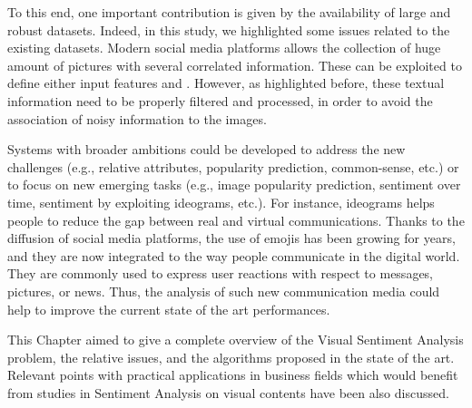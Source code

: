 
To this end, one important contribution is given by the availability of large and robust datasets. Indeed, in this study, we highlighted some issues related to the existing datasets.
Modern social media platforms allows the collection of huge amount of pictures with several correlated information. These can be exploited to define either input features and . However, as highlighted before, these textual information need to be properly filtered and processed, in order to avoid the association of noisy information to the images.

Systems with broader ambitions could be developed to address the new challenges (e.g., relative attributes, popularity prediction, common-sense, etc.) or to focus on new emerging tasks (e.g., image popularity prediction, sentiment over time, sentiment by exploiting ideograms, etc.).
For instance, ideograms helps people to reduce the gap between real and virtual communications. Thanks to the diffusion of social media platforms, the use of emojis has been growing for years, and they are now integrated to the way people communicate in the digital world. They are commonly used to express user reactions with respect to messages, pictures, or news. Thus, the analysis of such new communication media could help to improve the current state of the art performances.  

This Chapter aimed to give a complete overview of the Visual Sentiment Analysis problem, the relative issues, and the algorithms proposed in the state of the art. %
Relevant points with practical applications in business fields which would benefit from studies in Sentiment Analysis on visual contents have been also discussed.

